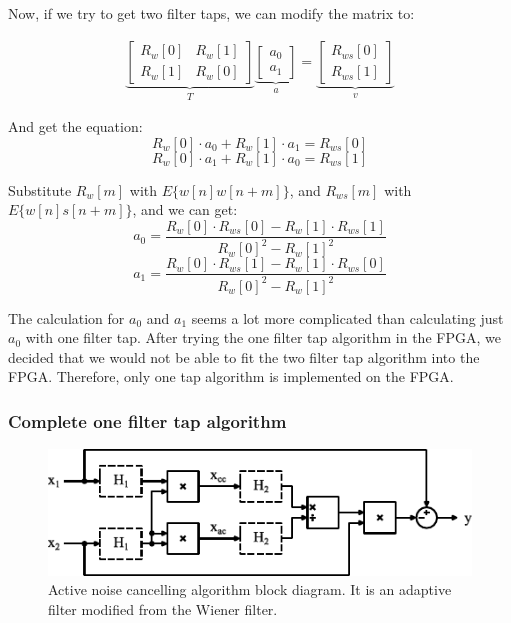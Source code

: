 Now, if we try to get two filter taps, we can modify the matrix to:

\begin{gather}
\underbrace{
    \begin{bmatrix}
    R_w[0] & R_w[1]\\
    R_w[1] & R_w[0]
    \end{bmatrix}
}_{T}
\underbrace{
    \begin{bmatrix}
    a_0 \\
    a_1
    \end{bmatrix}
}_{a}
=
\underbrace{
    \begin{bmatrix}
    R_{ws}[0] \\
    R_{ws}[1]
    \end{bmatrix}
}_{v}
\end{gather}

And get the equation:
$$R_w[0] \cdot a_0 + R_w[1] \cdot a_1 = R_{ws}[0]$$
$$R_w[0] \cdot a_1 + R_w[1] \cdot a_0 = R_{ws}[1]$$

Substitute $R_w[m]$ with $E\{w[n]w[n+m]\}$, and $R_{ws}[m]$ with $E\{w[n]s[n+m]\}$, and we can get:
$$a_0 = \frac{R_w[0] \cdot R_{ws}[0] - R_w[1] \cdot R_{ws}[1]}{R_w[0]^2 - R_w[1]^2}$$
$$a_1 = \frac{R_w[0] \cdot R_{ws}[1] - R_w[1] \cdot R_{ws}[0]}{R_w[0]^2 - R_w[1]^2}$$

The calculation for $a_0$ and $a_1$ seems a lot more complicated than calculating just $a_0$ with one filter tap.  After trying the one filter tap algorithm in the FPGA, we decided that we would not be able to fit the two filter tap algorithm into the FPGA.  Therefore, only one tap algorithm is implemented on the FPGA.

\subsubsection{Complete one filter tap algorithm}

\begin{figure}[H]
\centerline{\includegraphics[width=1\linewidth]{4-ANC_Sys/DSP.pdf}}
\caption{Active noise cancelling algorithm block diagram.  It is an adaptive filter modified from the Wiener filter.}
\label{fig_DSP}
\end{figure}

